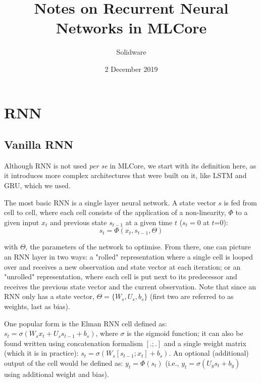 \documentclass{article}
\begin{document}
\title{Notes on Recurrent Neural Networks in MLCore}
\author{Solidware}
\date{2 December 2019}
\maketitle


\section{RNN}
\label{rnn}

\subsection{Vanilla RNN}
Although RNN is not used \textit{per se} in MLCore, we start with its definition here, as it introduces more complex architectures that were built on it, like LSTM and GRU, which we used.

The most basic RNN is a single layer neural network. A state vector $s$ is fed from cell to cell, where each cell consists of the application of a non-linearity, $\Phi$ to a given input $x_t$ and previous state $s_{t-1}$ at a given time $t$ ($s_t=0$ at $t$=0):
\begin{equation}
  \label{rnn}
  s_t=\Phi(x_t, s_{t-1}, \Theta)
\end{equation}

with $\Theta$, the parameters of the network to optimise. From there, one can picture an RNN layer in two ways: a "rolled" representation where a single cell is looped over and receives a new observation and state vector at each iteration; or an "unrolled" representation, where each cell is put next to its predecessor and receives the previous state vector and the current observation. Note that since an RNN only has a state vector, $\Theta=\{W_s, U_s, b_s\}$ (first two are referred to as weights, last as bias).

One popular form is the Elman RNN cell defined as: $s_t=\sigma(W_s x_t + U_s s_{t-1} + b_s)$, where $\sigma$ is the sigmoid function; it can also be found written using concatenation formalism $[.;.]$ and a single weight matrix (which it is in practice): $s_t=\sigma(W_s [s_{t-1}; x_t] + b_s)$. An optional (additional) output of the cell would be defined as: $y_t=\Phi(s_t)$ (i.e., $y_t=\sigma(U_y s_t + b_y)$ using additional weight and bias).
\end{document}
